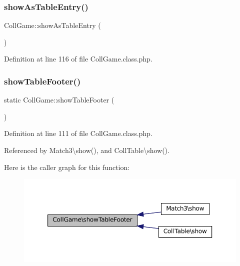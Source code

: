 \subsubsection{\texorpdfstring{show\+As\+Table\+Entry()}{showAsTableEntry()}}
{\footnotesize\ttfamily Coll\+Game\+::show\+As\+Table\+Entry (\begin{DoxyParamCaption}{ }\end{DoxyParamCaption})}



Definition at line 116 of file Coll\+Game.\+class.\+php.

\mbox{\label{class_coll_game_aa2b1a672491009ec315adeda42efa46c}} 
\subsubsection{\texorpdfstring{show\+Table\+Footer()}{showTableFooter()}}
{\footnotesize\ttfamily static Coll\+Game\+::show\+Table\+Footer (\begin{DoxyParamCaption}{ }\end{DoxyParamCaption})\hspace{0.3cm}{\ttfamily [static]}}



Definition at line 111 of file Coll\+Game.\+class.\+php.



Referenced by Match3\textbackslash{}show(), and Coll\+Table\textbackslash{}show().

Here is the caller graph for this function\+:\nopagebreak
\begin{figure}[H]
\begin{center}
\leavevmode
\includegraphics[width=350pt]{class_coll_game_aa2b1a672491009ec315adeda42efa46c_icgraph}
\end{center}
\end{figure}
\mbox{\label{class_coll_game_a91770bcb8218abf1e7dc0b48d2a0c2d5}} 
